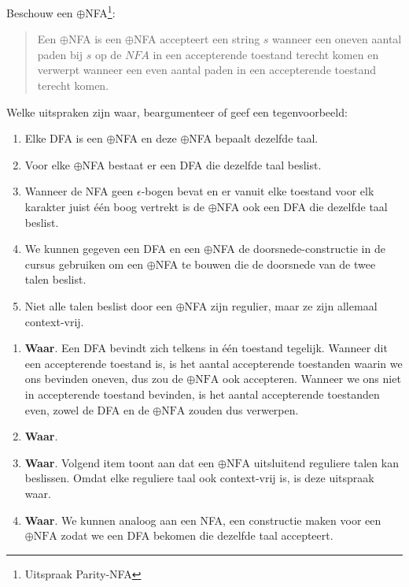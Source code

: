 \documentclass{article}
\begin{document}
\begin{question}
Beschouw een $\oplus$NFA\footnote{Uitspraak Parity-NFA}:
\begin{quote}
\begin{definition}
Een $\oplus$NFA is een $\oplus$NFA accepteert een string $s$ wanneer een oneven aantal paden bij $s$ op de $NFA$ in een accepterende toestand terecht komen en verwerpt wanneer een even aantal paden in een accepterende toestand terecht komen.
\end{definition}
\end{quote}
Welke uitspraken zijn waar, beargumenteer of geef een tegenvoorbeeld:
\begin{enumerate}
 \item Elke DFA is een $\oplus$NFA en deze $\oplus$NFA bepaalt dezelfde taal.
 \item Voor elke $\oplus$NFA bestaat er een DFA die dezelfde taal beslist.
 \item Wanneer de NFA geen $\epsilon$-bogen bevat en er vanuit elke toestand voor elk karakter juist \'e\'en boog vertrekt is de $\oplus$NFA ook een DFA die dezelfde taal beslist.
 \item We kunnen gegeven een DFA en een $\oplus$NFA de doorsnede-constructie in de cursus gebruiken om een $\oplus$NFA te bouwen die de doorsnede van de twee talen beslist.
 \item Niet alle talen beslist door een $\oplus$NFA zijn regulier, maar ze zijn allemaal context-vrij.
\end{enumerate}
\begin{answer}
\begin{enumerate}
 \item \textbf{Waar}. Een DFA bevindt zich telkens in \'e\'en toestand tegelijk. Wanneer dit een accepterende toestand is, is het aantal accepterende toestanden waarin we ons bevinden oneven, dus zou de $\oplus\mbox{NFA}$ ook accepteren. Wanneer we ons niet in accepterende toestand bevinden, is het aantal accepterende toestanden even, zowel de DFA en de $\oplus\mbox{NFA}$ zouden dus verwerpen.
 \item \textbf{Waar}.
 \item \textbf{Waar}. Volgend item toont aan dat een $\oplus\mbox{NFA}$ uitsluitend reguliere talen kan beslissen. Omdat elke reguliere taal ook context-vrij is, is deze uitspraak waar.
 \item \textbf{Waar}. We kunnen analoog aan een NFA, een constructie maken voor een $\oplus\mbox{NFA}$ zodat we een DFA bekomen die dezelfde taal accepteert.
 \begin{quote}
  
 \end{quote}

\end{enumerate}

\end{answer}
\end{question}
\end{document}
